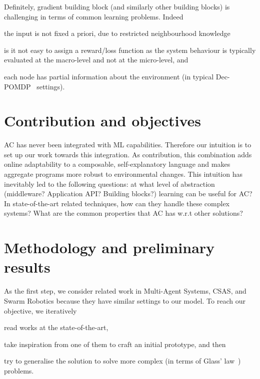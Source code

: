 \documentclass[conference]{IEEEtran}
\begin{document}
Definitely, gradient building block (and similarly other building blocks) is challenging in terms of common learning problems. Indeed
\begin{enumerate*}[label=(\roman*)]
\item the input is not fixed a priori, due to restricted neighbourhood knowledge
\item is it not easy to assign a reward/loss function as the system behaviour is typically evaluated at the macro-level and not at the micro-level, and
\item each node has partial information about the environment (in typical Dec-POMDP~\cite{DBLP:conf/uai/BernsteinZI00} settings).
\end{enumerate*}
\section{Contribution and objectives}
AC has never been integrated with ML capabilities.
%
Therefore our intuition is to set up our work towards this integration.
%
As contribution, this combination adds online adaptability to a composable, self-explanatory language and makes aggregate programs more robust to environmental changes.
%
This intuition has inevitably led to the following questions: %
at what level of abstraction (middleware? Application API? Building blocks?) learning can be useful for AC?
%
In state-of-the-art related techniques, how can they handle these complex systems?
%
What are the common properties that AC has w.r.t other solutions?
\section{Methodology and preliminary results}
%
As the first step, we consider related work in Multi-Agent Systems, CSAS, and Swarm Robotics because they have similar settings to our model.
To reach our objective, we iteratively 
\begin{enumerate*}[label=(\roman*)]
\item read works at the state-of-the-art,
\item take inspiration from one of them to craft an initial prototype, and then
\item try to generalise the solution to solve more complex (in terms of Glass' law~\cite{DBLP:journals/software/Glass01}) problems.
\end{enumerate*}
\end{document}
